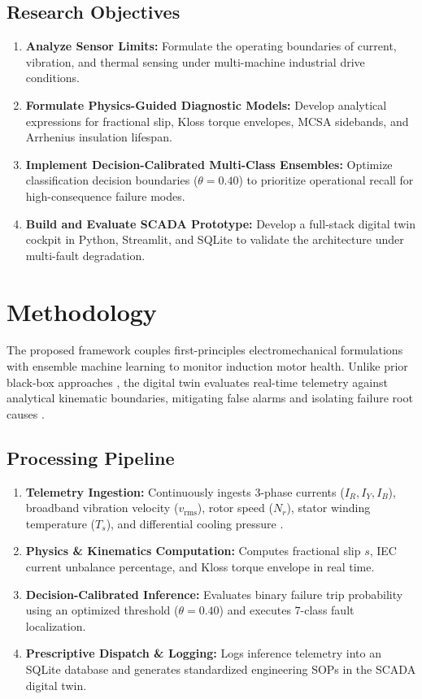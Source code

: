 \documentclass[conference]{IEEEtran}
\begin{document}
\subsection{Research Objectives}
\begin{enumerate}
    \item \textbf{Analyze Sensor Limits:} Formulate the operating boundaries of current, vibration, and thermal sensing under multi-machine industrial drive conditions.
    \item \textbf{Formulate Physics-Guided Diagnostic Models:} Develop analytical expressions for fractional slip, Kloss torque envelopes, MCSA sidebands, and Arrhenius insulation lifespan.
    \item \textbf{Implement Decision-Calibrated Multi-Class Ensembles:} Optimize classification decision boundaries ($\theta = 0.40$) to prioritize operational recall for high-consequence failure modes.
    \item \textbf{Build and Evaluate SCADA Prototype:} Develop a full-stack digital twin cockpit in Python, Streamlit, and SQLite to validate the architecture under multi-fault degradation.
\end{enumerate}

\section{Methodology}
The proposed framework couples first-principles electromechanical formulations with ensemble machine learning to monitor induction motor health. Unlike prior black-box approaches \cite{ref4,ref6}, the digital twin evaluates real-time telemetry against analytical kinematic boundaries, mitigating false alarms and isolating failure root causes \cite{ref7}.

\subsection{Processing Pipeline}
\begin{enumerate}
    \item \textbf{Telemetry Ingestion:} Continuously ingests 3-phase currents ($I_R, I_Y, I_B$), broadband vibration velocity ($v_{\text{rms}}$), rotor speed ($N_r$), stator winding temperature ($T_s$), and differential cooling pressure \cite{ref1,ref5}.
    \item \textbf{Physics \& Kinematics Computation:} Computes fractional slip $s$, IEC current unbalance percentage, and Kloss torque envelope in real time.
    \item \textbf{Decision-Calibrated Inference:} Evaluates binary failure trip probability using an optimized threshold ($\theta = 0.40$) and executes 7-class fault localization.
    \item \textbf{Prescriptive Dispatch \& Logging:} Logs inference telemetry into an SQLite database and generates standardized engineering SOPs in the SCADA digital twin.
\end{enumerate}
\end{document}
